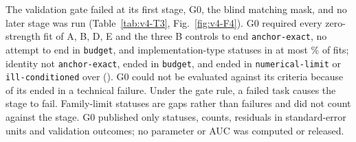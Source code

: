 The validation gate failed at its first stage, G0, the blind matching mask, and no later stage was run (Table~\ref{tab:v4-T3}, Fig.~\ref{fig:v4-F4}). %
G0 required every zero-strength fit of A, B, D, E and the three B controls to end \texttt{anchor-exact}, no attempt to end in \texttt{budget}, and implementation-type statuses in at most \% of fits;  identity   not \texttt{anchor-exact},   ended in \texttt{budget}, and   ended in \texttt{numerical-limit} or \texttt{ill-conditioned} over   (). %
G0 could not be evaluated against its criteria because  of its   ended in a technical failure. Under the gate rule, a failed task causes the stage to fail. %
Family-limit statuses are gaps rather than failures and did not count against the stage. %
G0 published only statuses, counts, residuals in standard-error units and validation outcomes; no parameter or AUC was computed or released. %



